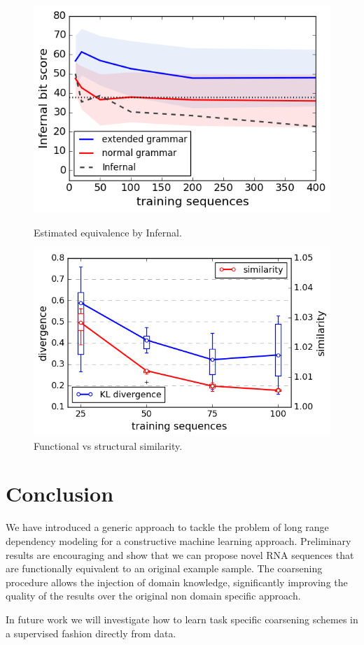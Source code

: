 \documentclass{article}
\begin{document}
\begin{figure}[ht]
      \centering
  \begin{minipage}[b]{0.47\textwidth}
    \includegraphics[width=\textwidth]{images/infernal_abstr.png}
    \caption{Estimated equivalence by Infernal.}
      \label{infeval}
  \end{minipage}
  \hfill
  \begin{minipage}[b]{0.52\textwidth}
    \includegraphics[width=\textwidth]{images/learningcurve.png}
    \caption{Functional vs structural similarity.}
     \label{learncurve}
  \end{minipage}
\end{figure}

 
\section{Conclusion}

We have introduced a generic approach to tackle the problem of long range
dependency modeling for a constructive machine learning approach.
Preliminary results are encouraging and show that we can propose novel
RNA sequences that are functionally equivalent to an original example sample.
The coarsening procedure allows the injection of domain knowledge,
significantly improving the quality of the results over the original non domain
specific approach. 

In future work we will investigate how to learn task
specific coarsening schemes in a supervised fashion directly from data.



\end{document}
